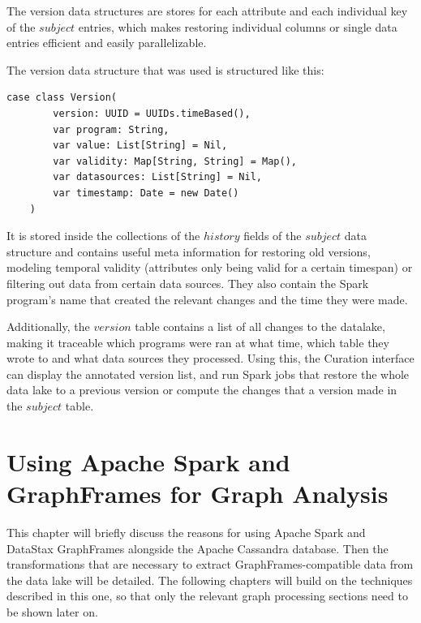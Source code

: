 \documentclass[
        a4paper,     %
        titlepage,   %
        oneside,     %
        parskip      %
        ]{scrartcl}  %
\begin{document}
    The version data structures are stores for each attribute and each individual
    key of the $subject$ entries, which makes restoring individual columns or single
    data entries efficient and easily parallelizable.

    The version data structure that was used is structured like this:
    \begin{lstlisting}[style=scalaStyle,caption=Version]
    case class Version(
    	version: UUID = UUIDs.timeBased(),
    	var program: String,
    	var value: List[String] = Nil,
    	var validity: Map[String, String] = Map(),
    	var datasources: List[String] = Nil,
    	var timestamp: Date = new Date()
    )
    \end{lstlisting}

    It is stored inside the collections of the $history$ fields of the $subject$
    data structure and contains useful meta information for restoring old versions,
    modeling temporal validity (attributes only being valid for a certain timespan)
    or filtering out data from certain data sources. They also contain the Spark
    program's name that created the relevant changes and the time they were made.

    Additionally, the $version$ table contains a list of all changes to the datalake,
    making it traceable which programs were ran at what time, which table they wrote
    to and what data sources they processed. Using this, the Curation interface
    can display the annotated version list, and run Spark jobs that restore the
    whole data lake to a previous version or compute the changes that a version
    made in the $subject$ table.
    \pagebreak

  \section{Using Apache Spark and GraphFrames for Graph Analysis}
  This chapter will briefly discuss the reasons for using Apache Spark and DataStax GraphFrames
  alongside the Apache Cassandra database. Then the transformations that are
  necessary to extract GraphFrames-compatible data from the data lake will be detailed.
  The following chapters will build on the techniques described in this one, so
  that only the relevant graph processing sections need to be shown later on.
\end{document}
